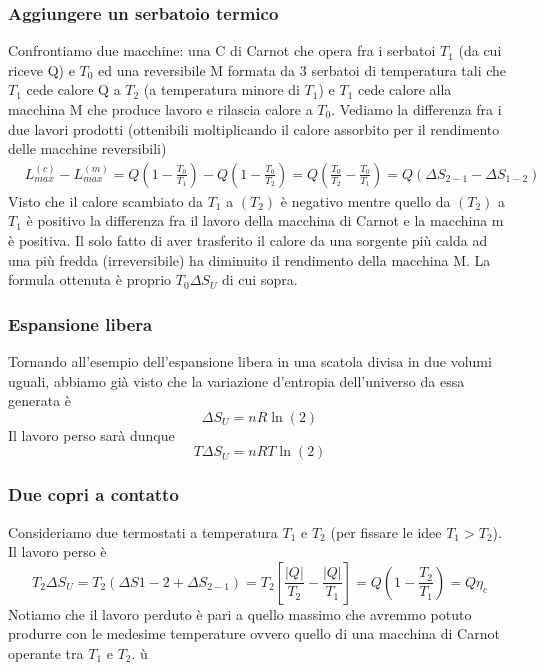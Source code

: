 \documentclass[10pt,a4paper]{article}
\begin{document}
\subsubsection{Aggiungere un serbatoio termico}
Confrontiamo due macchine: una C di Carnot che opera fra i serbatoi \(T_1\) (da cui riceve Q) e \(T_0\) ed una reversibile M formata da 3 serbatoi di temperatura tali che \(T_1\) cede calore Q a \(T_2\) (a temperatura minore di \(T_1\)) e \(T_1\) cede calore alla macchina M che produce lavoro e rilascia calore a \(T_0\). Vediamo la differenza fra i due lavori prodotti (ottenibili moltiplicando il calore assorbito per il rendimento delle macchine reversibili)
\begin{align*}
	&L_{max}^{(c)}-L_{max}^{(m)}=Q\left(1-\frac{T_0}{T_1}\right)-Q\left(1-\frac{T_0}{T_2}\right)=Q\left(\frac{T_0}{T_2}-\frac{T_0}{T_1}\right)=Q(\Delta S_{2-1}-\Delta S_{1-2}) 
\end{align*}
Visto che il calore scambiato da \(T_1\) a \((T_2)\) è negativo mentre quello da \((T_2)\) a \(T_1\) è positivo la differenza fra il lavoro della macchina di Carnot e la macchina m è positiva. Il solo fatto di aver trasferito il calore da una sorgente più calda ad una più fredda (irreversibile) ha diminuito il rendimento della macchina M. La formula ottenuta è proprio \(T_0\Delta S_U\) di cui sopra. 
\subsubsection{Espansione libera}
Tornando all'esempio dell'espansione libera in una scatola divisa in due volumi uguali, abbiamo già visto che la variazione d'entropia dell'universo da essa generata è \[\Delta S_U = n R \ln(2)\]
Il lavoro perso sarà dunque \[T\Delta S_U = n R T \ln(2)\]
\subsubsection{Due copri a contatto}
Consideriamo due termostati a temperatura \(T_1\) e \(T_2\) (per fissare le idee \(T_1 > T_2\)). Il lavoro perso è 
\[T_2 \Delta S_U = T_2(\Delta S{1-2}+\Delta S_{2-1})=T_2\left[\frac{|Q|}{T_2}-\frac{|Q|}{T_1}\right] = Q\left(1-\frac{T_2}{T_1}\right) =Q\eta_c\]
Notiamo che il lavoro perduto è pari a quello massimo che avremmo potuto produrre con le medesime temperature ovvero quello di una macchina di Carnot operante tra \(T_1\) e \(T_2\). ù
\end{document}

